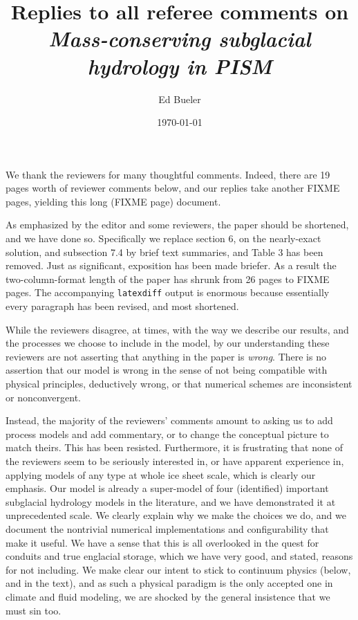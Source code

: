 \documentclass[11pt,reqno]{amsart}
\title[Replies to Referee Comments]{Replies to all referee comments on \\ \emph{Mass-conserving subglacial hydrology in PISM}}
\author{Ed Bueler}
\date{\today}
\begin{document}
\maketitle

\thispagestyle{empty}

We thank the reviewers for many thoughtful comments.  Indeed, there are 19 pages worth of reviewer comments below, and our replies take another FIXME pages, yielding this long (FIXME page) document.

As emphasized by the editor and some reviewers, the paper should be shortened, and we have done so.  Specifically we replace section 6, on the nearly-exact solution, and subsection 7.4 by brief text summaries, and Table 3 has been removed.  Just as significant, exposition has been made briefer.  As a result the two-column-format length of the paper has shrunk from 26 pages to FIXME pages.  The accompanying \texttt{latexdiff} output is enormous because essentially every paragraph has been revised, and most shortened.

While the reviewers disagree, at times, with the way we describe our results, and the processes we choose to include in the model, by our understanding these reviewers are not asserting that anything in the paper is \emph{wrong}.  There is no assertion that our model is wrong in the sense of not being compatible with physical principles, deductively wrong, or that numerical schemes are inconsistent or nonconvergent.

Instead, the majority of the reviewers' comments amount to asking us to add process models and add commentary, or to change the conceptual picture to match theirs.  This has been resisted.  Furthermore, it is frustrating that none of the reviewers seem to be seriously interested in, or have apparent experience in, applying models of any type at whole ice sheet scale, which is clearly our emphasis.  Our model is already a super-model of four (identified) important subglacial hydrology models in the literature, and we have demonstrated it at unprecedented scale.  We clearly explain why we make the choices we do, and we document the nontrivial numerical implementations and configurability that make it useful.  We have a sense that this is all overlooked in the quest for conduits and true englacial storage, which we have very good, and stated, reasons for not including.  We make clear our intent to stick to continuum physics (below, and in the text), and as such a physical paradigm is the only accepted one in climate and fluid modeling, we are shocked by the general insistence that we must sin too.
\end{document}
